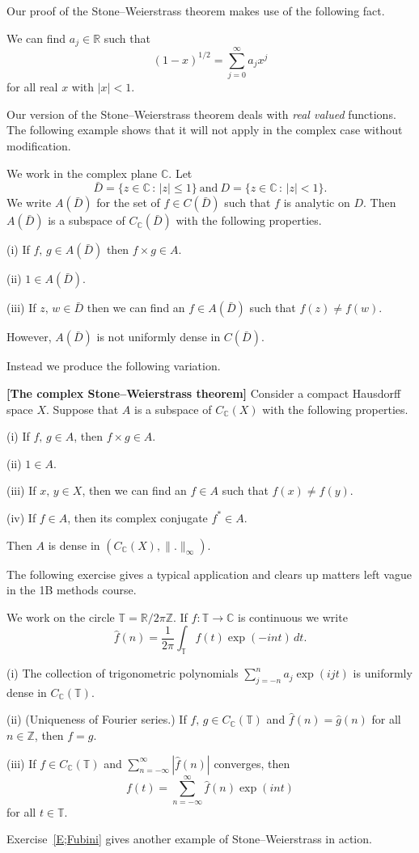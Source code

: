 Our proof of the Stone--Weierstrass theorem makes use
of the following fact.
\begin{lemma}\label{L;Taylor for Stone} 
We can find $a_{j}\in{\mathbb R}$ such that
\[(1-x)^{1/2}=\sum_{j=0}^{\infty}a_{j}x^{j}\]
for all real $x$ with $|x|<1$.
\end{lemma}

Our version of the Stone--Weierstrass theorem 
deals with \emph{real valued} functions.
The following example shows that it will not
apply in the complex case without modification.
\begin{example} We work in the complex plane ${\mathbb C}$.
Let
\[\bar{D}=\{z\in{\mathbb C}\,:\,|z|\leq 1\}
\ \text{and}
\ D=\{z\in{\mathbb C}\,:\,|z|<1\}.\]
We write $A(\bar{D})$ for the set of $f\in C(\bar{D})$
such that $f$ is analytic on $D$. Then
$A(\bar{D})$ is a subspace of $C_{\mathbb C}(\bar{D})$ 
with the following properties.

(i) If $f,\,g\in A(\bar{D})$ then $f\times g\in A$.

(ii) $1\in A(\bar{D})$.

(iii) If $z,\,w\in \bar{D}$ then we can find an $f\in A(\bar{D})$ 
such that $f(z)\neq f(w)$.

However, $A(\bar{D})$ is not uniformly dense in $C(\bar{D})$.
\end{example}

Instead we produce the following variation.
\begin{theorem}{\bf [The complex Stone--Weierstrass theorem]}
Consider a compact Hausdorff space $X$. Suppose
that $A$ is a subspace of $C_{\mathbb C}(X)$
with the following properties.

(i) If $f,\,g\in A$, then $f\times g\in A$.

(ii) $1\in A$.

(iii) If $x,\,y\in X$, then we can find an $f\in A$
such that $f(x)\neq f(y)$.

(iv) If $f\in A$, then its complex conjugate $f^{*}\in A$.

Then $A$ is dense in $(C_{\mathbb C}(X),\|.\|_{\infty})$.
\end{theorem}
The following exercise gives a typical application
and clears up matters left vague in the 1B methods course.
\begin{exercise}\label{E; Fourier dense}
We work on the circle
${\mathbb T}={\mathbb R}/2\pi{\mathbb Z}$.
If $f:{\mathbb T}\rightarrow{\mathbb C}$ is continuous
we write
\[\hat{f}(n)=\frac{1}{2\pi}\int_{\mathbb T}f(t)\exp(-int)\,dt.\]

(i) The collection of trigonometric polynomials
$\sum_{j=-n}^{n}a_{j}\exp(ijt)$ is uniformly dense in
$C_{\mathbb C}({\mathbb T})$.

(ii) (Uniqueness of Fourier series.)
If $f,\,g\in C_{\mathbb C}({\mathbb T})$ and
$\hat{f}(n)=\hat{g}(n)$ for all $n\in{\mathbb Z}$,
then $f=g$.

(iii) If $f\in C_{\mathbb C}({\mathbb T})$
and $\sum_{n=-\infty}^{\infty}|\hat{f}(n)|$ converges,
then
\[f(t)=\sum_{n=-\infty}^{\infty}\hat{f}(n)\exp(int)\]
for all $t\in{\mathbb T}$.
\end{exercise}
Exercise~\ref{E;Fubini} gives another example
of Stone--Weierstrass in action.
